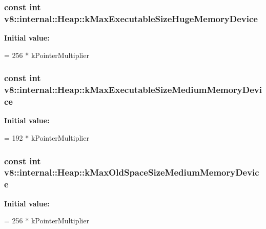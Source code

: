 \subsubsection[{\texorpdfstring{k\+Max\+Executable\+Size\+Huge\+Memory\+Device}{kMaxExecutableSizeHugeMemoryDevice}}]{\setlength{\rightskip}{0pt plus 5cm}const int v8\+::internal\+::\+Heap\+::k\+Max\+Executable\+Size\+Huge\+Memory\+Device\hspace{0.3cm}{\ttfamily [static]}}\hypertarget{classv8_1_1internal_1_1_heap_a92e8000fdcc2634cbd56a6d10d513d3b}{}\label{classv8_1_1internal_1_1_heap_a92e8000fdcc2634cbd56a6d10d513d3b}
{\bfseries Initial value\+:}
\begin{DoxyCode}
=
      256 * kPointerMultiplier
\end{DoxyCode}
\subsubsection[{\texorpdfstring{k\+Max\+Executable\+Size\+Medium\+Memory\+Device}{kMaxExecutableSizeMediumMemoryDevice}}]{\setlength{\rightskip}{0pt plus 5cm}const int v8\+::internal\+::\+Heap\+::k\+Max\+Executable\+Size\+Medium\+Memory\+Device\hspace{0.3cm}{\ttfamily [static]}}\hypertarget{classv8_1_1internal_1_1_heap_aab9895e6cb7753f4c9190e0284b600e5}{}\label{classv8_1_1internal_1_1_heap_aab9895e6cb7753f4c9190e0284b600e5}
{\bfseries Initial value\+:}
\begin{DoxyCode}
=
      192 * kPointerMultiplier
\end{DoxyCode}
\subsubsection[{\texorpdfstring{k\+Max\+Old\+Space\+Size\+Medium\+Memory\+Device}{kMaxOldSpaceSizeMediumMemoryDevice}}]{\setlength{\rightskip}{0pt plus 5cm}const int v8\+::internal\+::\+Heap\+::k\+Max\+Old\+Space\+Size\+Medium\+Memory\+Device\hspace{0.3cm}{\ttfamily [static]}}\hypertarget{classv8_1_1internal_1_1_heap_a5ad67fb00b85454f891109dd188286dc}{}\label{classv8_1_1internal_1_1_heap_a5ad67fb00b85454f891109dd188286dc}
{\bfseries Initial value\+:}
\begin{DoxyCode}
=
      256 * kPointerMultiplier
\end{DoxyCode}

